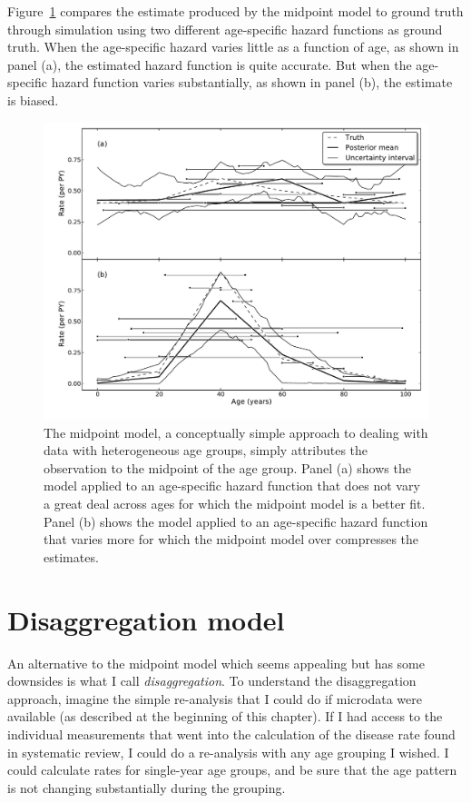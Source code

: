 Figure~\ref{midpoint} compares the estimate produced by the midpoint
model to ground truth through simulation using two different
age-specific hazard functions as ground truth.  When the age-specific
hazard varies little as a function of age, as shown in panel (a), the
estimated hazard function is quite accurate.  But when the age-specific hazard function
varies substantially, as shown in panel (b), the estimate is biased.


\begin{figure}[h]
\begin{center}
\includegraphics[width=\textwidth]{age_group_midpoint.pdf}
\caption{The midpoint model, a conceptually simple approach to
  dealing with data with heterogeneous age groups, simply
  attributes the observation to the midpoint of the age group.  Panel
  (a) shows the model applied to an age-specific hazard function that does not
  vary a great deal across ages for which the midpoint model is a
  better fit.  Panel (b) shows the model applied to an age-specific hazard function
  that varies more for which the midpoint model over compresses the
  estimates.}
\label{midpoint}
\end{center}
\end{figure}


\section{Disaggregation model}
An alternative to the midpoint model which seems appealing but has
some downsides is what I call \emph{disaggregation}.  To understand
the disaggregation approach, imagine the simple re-analysis that I
could do if microdata were available (as described at the beginning of
this chapter).  If I had access to the individual measurements that
went into the calculation of the disease rate found in systematic
review, I could do a re-analysis with any age grouping I wished. I
could calculate rates for single-year age groups, and be sure that the
age pattern is not changing substantially during the grouping.


